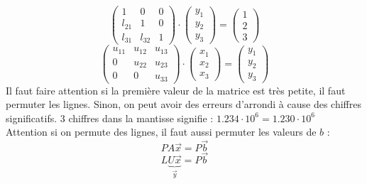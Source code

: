 \begin{equation}
    \begin{pmatrix}
        1      & 0      & 0 \\
        l_{21} & 1      & 0 \\
        l_{31} & l_{32} & 1
    \end{pmatrix}
    \cdot
    \begin{pmatrix}
        y_1 \\
        y_2 \\
        y_3
    \end{pmatrix}
    =
    \begin{pmatrix}
        1 \\
        2 \\
        3
    \end{pmatrix}
    \nonumber
\end{equation}
\begin{equation}
    \begin{pmatrix}
        u_{11} & u_{12} & u_{13} \\
        0      & u_{22} & u_{23} \\
        0      & 0      & u_{33}
    \end{pmatrix}
    \cdot
    \begin{pmatrix}
        x_1 \\
        x_2 \\
        x_3
    \end{pmatrix}
    =
    \begin{pmatrix}
        y_1 \\
        y_2 \\
        y_3
    \end{pmatrix}
    \nonumber
\end{equation}
Il faut faire attention si la première valeur de la matrice est très petite,
il faut permuter les lignes. Sinon, on peut avoir des erreurs d'arrondi à cause
des chiffres significatifs. 3 chiffres dans la mantisse signifie
: $1.234\cdot 10^6=1.230\cdot 10^6$\\
Attention si on permute des lignes, il faut aussi permuter les valeurs de $b$ :
\begin{equation}
    PA\overrightarrow{x}=P\overrightarrow{b}
    \nonumber
\end{equation}
\begin{equation}
    L\underbrace{U\overrightarrow{x}}_{\overrightarrow{y}}=P\overrightarrow{b}
    \nonumber
\end{equation}
